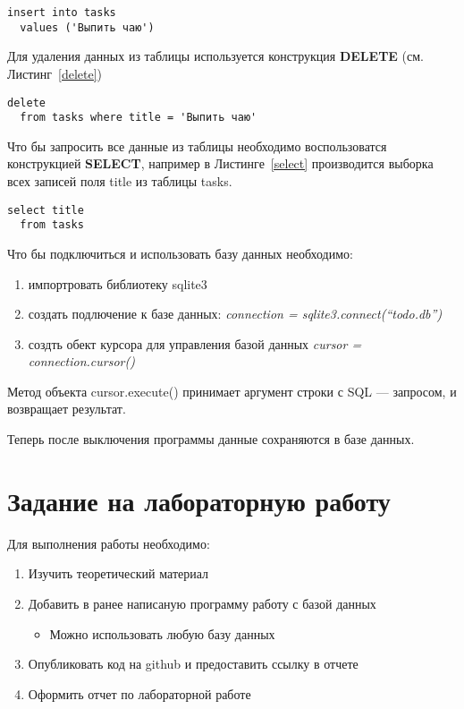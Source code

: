 \documentclass[a4paper]{article}
\begin{document}
\begin{lstlisting}[label=insert,caption=Добавление новой записи]
  insert into tasks
  values ('Выпить чаю')
\end{lstlisting}

Для удаления данных из таблицы используется конструкция \textbf{DELETE} (см. Листинг~\ref{delete})

\begin{lstlisting}[label=delete,caption=Создание таблицы]
  delete
  from tasks where title = 'Выпить чаю'
\end{lstlisting}

Что бы запросить все данные из таблицы необходимо воспользоватся конструкцией \textbf{SELECT}, например в Листинге~\ref{select} производится выборка всех записей поля title из таблицы tasks.

\begin{lstlisting}[label=select,caption=Выборка данных]
  select title
  from tasks
\end{lstlisting}

Что бы подключиться и использовать базу данных необходимо:
\begin{enumerate}
  \item импортровать библиотеку sqlite3
  \item создать подлючение к базе данных: \textit{connection = sqlite3.connect(``todo.db'')}
  \item создть обект курсора для управления базой данных \textit{cursor = connection.cursor()}
\end{enumerate}

Метод объекта \textsf{cursor.execute()} принимает аргумент строки с SQL --- запросом, и возвращает результат.



Теперь после выключения программы данные сохраняются в базе данных.

\newpage
\section{Задание на лабораторную работу}

Для выполнения работы необходимо:
\begin{enumerate}
  \item Изучить теоретический материал
  \item Добавить в ранее написаную программу работу с базой данных
    \begin{itemize}
      \item Можно использовать любую базу данных
    \end{itemize}
  \item Опубликовать код на github и предоставить ссылку в отчете
  \item Оформить отчет по лабораторной работе
\end{enumerate}
\end{document}
